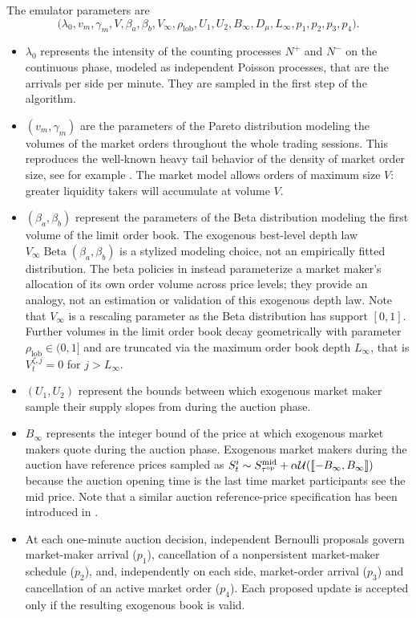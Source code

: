 \documentclass[11pt]{article}
\begin{document}
{The emulator parameters are
\[
\bigl(\lambda_0,v_m,\gamma_m,V,\beta_a,\beta_b,V_\infty,
\rho_{\mathrm{lob}},U_1,U_2,B_\infty,D_\mu,L_\infty,p_1,p_2,p_3,p_4\bigr).
\]}
\begin{itemize}
    \item $\lambda_0$ represents the intensity of the counting processes $N^+$ and $N^-$ on the continuous phase, modeled as independent Poisson processes, that are the arrivals per side per minute. They are sampled in the first step of the algorithm.
    \item $(v_m,\gamma_m)$ are the parameters of the Pareto distribution modeling the volumes of the market orders throughout the whole trading sessions. This reproduces the well-known heavy tail behavior of the density of market order size, see for example \cite{gopikrishnan2000statistical,gabaix2009power,bouchaud2001power}. The market model allows orders of maximum size $V$: greater liquidity takers will accumulate at volume $V$.
    \item $(\beta_a,\beta_b)$ represent the parameters of the Beta distribution modeling the first volume of the limit order book. {The exogenous best-level depth law $V_\infty\operatorname{Beta}(\beta_a,\beta_b)$ is a stylized modeling choice, not an empirically fitted distribution. The beta policies in \cite{jerome2022market,wang2024market} instead parameterize a market maker's allocation of its own order volume across price levels; they provide an analogy, not an estimation or validation of this exogenous depth law.}  Note that $V_\infty$ is a rescaling parameter as the Beta distribution has support $[0,1]$. Further volumes in the limit order book decay geometrically with parameter $\rho_{\text{lob}} \in (0,1]$ and are truncated via the maximum order book depth $L_\infty$, that is $V_t^{\zeta,j}=0$ for $j > L_\infty$.
    \item $(U_1,U_2)$ represent the bounds between which exogenous market maker sample their supply slopes from during the auction phase.
    \item $B_\infty$ {represents} the integer bound of the price at which exogenous market makers quote during the auction phase. {Exogenous market makers during the auction have reference prices sampled as} $S_t^i \sim S_{\tau^{\mathrm{op}}}^\mathrm{mid} + \alpha \mathcal{U}(\llbracket -B_\infty,B_\infty \rrbracket)$ because the auction opening time is the last time market participants see the mid price. Note that {a similar auction reference-price specification has been introduced} in \cite{derchu2023equilibria}.
    \item {At each one-minute auction decision, independent Bernoulli proposals govern market-maker arrival ($p_1$), cancellation of a nonpersistent market-maker schedule ($p_2$), and, independently on each side, market-order arrival ($p_3$) and cancellation of an active market order ($p_4$). Each proposed update is accepted only if the resulting exogenous book is valid.}
\end{itemize}
\end{document}
